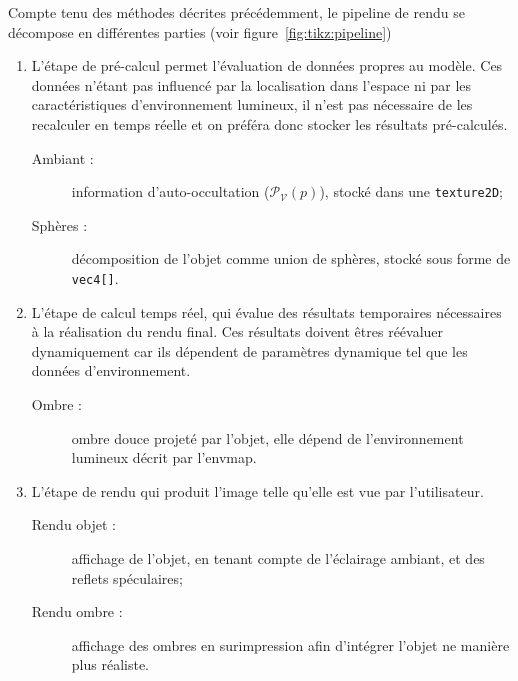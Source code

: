 \documentclass[10pt,a4paper,twoside, twocolumn]{report}
\newcommand*{\rootPath}{../}
\begin{document}
Compte tenu des méthodes décrites précédemment, le pipeline de rendu se décompose en différentes parties (voir figure~\ref{fig:tikz:pipeline})
\begin{enumerate}
	\item L'étape de pré-calcul permet l'évaluation de données propres au modèle. Ces données n'étant pas influencé par la localisation dans l'espace ni par les caractéristiques d'environnement lumineux, il n'est pas nécessaire de les recalculer en temps réelle et on préféra donc stocker les résultats pré-calculés.
		\begin{description}
			\item[Ambiant :] information d'auto-occultation ($\mathcal P_{\mathcal V}(p)$), stocké dans une \texttt{texture2D};
			\item[Sphères :] décomposition de l'objet comme union de sphères, stocké sous forme de \texttt{vec4[]}.
		\end{description}

	\item L'étape de calcul temps réel, qui évalue des résultats temporaires nécessaires à la réalisation du rendu final. Ces résultats doivent êtres réévaluer dynamiquement car ils dépendent de paramètres dynamique tel que les données d'environnement.
		\begin{description}
			\item[Ombre :] ombre douce projeté par l'objet, elle dépend de l'environnement lumineux décrit par l'envmap.
		\end{description}
	
	\item L'étape de rendu qui produit l'image telle qu'elle est vue par l'utilisateur.
		\begin{description}
			\item[Rendu objet :] affichage de l'objet, en tenant compte de l'éclairage ambiant, et des reflets spéculaires;
			\item[Rendu ombre :] affichage des ombres en surimpression afin d'intégrer l'objet ne manière plus réaliste.
		\end{description}
\end{enumerate}






\ifstandalone
	
	
\fi
\end{document}
